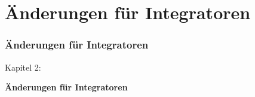 %

\section{Änderungen für Integratoren}
\begin{frame}[fragile]
	\frametitle{Änderungen für Integratoren}

	\begin{center}\huge{Kapitel 2:}\end{center}
	\begin{center}\huge{\color{typo3darkgrey}\textbf{Änderungen für Integratoren}}\end{center}

\end{frame}

